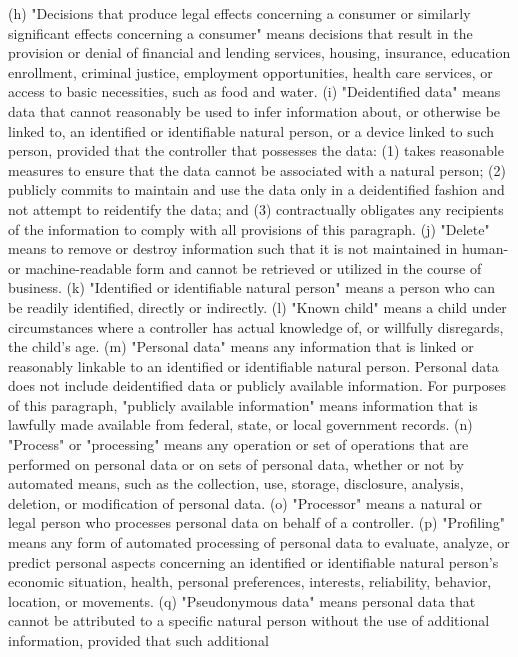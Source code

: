 (h) "Decisions that produce legal effects concerning a consumer or similarly significant
effects concerning a consumer" means decisions that result in the provision or denial of
financial and lending services, housing, insurance, education enrollment, criminal justice,
employment opportunities, health care services, or access to basic necessities, such as food
and water.
(i) "Deidentified data" means data that cannot reasonably be used to infer information
about, or otherwise be linked to, an identified or identifiable natural person, or a device
linked to such person, provided that the controller that possesses the data:
(1) takes reasonable measures to ensure that the data cannot be associated with a natural
person;
(2) publicly commits to maintain and use the data only in a deidentified fashion and not
attempt to reidentify the data; and
(3) contractually obligates any recipients of the information to comply with all provisions
of this paragraph.
(j) "Delete" means to remove or destroy information such that it is not maintained in
human- or machine-readable form and cannot be retrieved or utilized in the course of
business.
(k) "Identified or identifiable natural person" means a person who can be readily
identified, directly or indirectly.
(l) "Known child" means a child under circumstances where a controller has actual
knowledge of, or willfully disregards, the child's age.
(m) "Personal data" means any information that is linked or reasonably linkable to an
identified or identifiable natural person. Personal data does not include deidentified data or
publicly available information. For purposes of this paragraph, "publicly available
information" means information that is lawfully made available from federal, state, or local
government records.
(n) "Process" or "processing" means any operation or set of operations that are performed
on personal data or on sets of personal data, whether or not by automated means, such as
the collection, use, storage, disclosure, analysis, deletion, or modification of personal data.
(o) "Processor" means a natural or legal person who processes personal data on behalf
of a controller.
(p) "Profiling" means any form of automated processing of personal data to evaluate,
analyze, or predict personal aspects concerning an identified or identifiable natural person's
economic situation, health, personal preferences, interests, reliability, behavior, location,
or movements.
(q) "Pseudonymous data" means personal data that cannot be attributed to a specific
natural person without the use of additional information, provided that such additional
